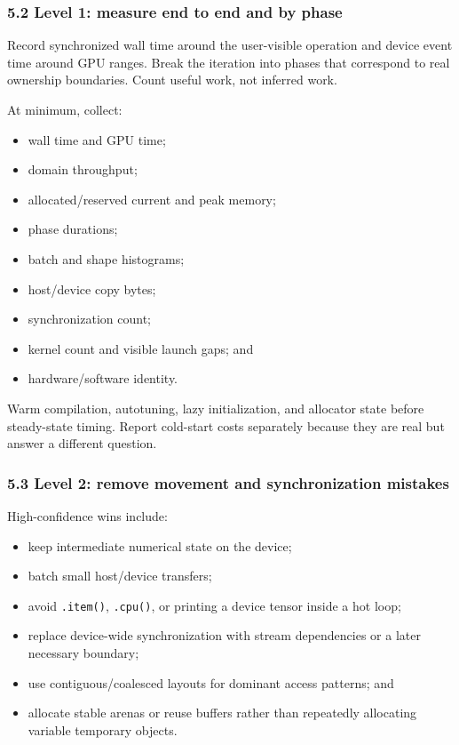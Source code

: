 \documentclass[
  10pt,
  letterpaper,
]{article}
\providecommand{\tightlist}{%
  \setlength{\itemsep}{0pt}\setlength{\parskip}{0pt}}
\begin{document}
\subsubsection{5.2 Level 1: measure end to end and by
phase}\label{52-level-1-measure-end-to-end-and-by-phase}

Record synchronized wall time around the user-visible operation and
device event time around GPU ranges. Break the iteration into phases
that correspond to real ownership boundaries. Count useful work, not
inferred work.

At minimum, collect:

\begin{itemize}
\tightlist
\item
  wall time and GPU time;
\item
  domain throughput;
\item
  allocated/reserved current and peak memory;
\item
  phase durations;
\item
  batch and shape histograms;
\item
  host/device copy bytes;
\item
  synchronization count;
\item
  kernel count and visible launch gaps; and
\item
  hardware/software identity.
\end{itemize}

Warm compilation, autotuning, lazy initialization, and allocator state
before steady-state timing. Report cold-start costs separately because
they are real but answer a different question.

\subsubsection{5.3 Level 2: remove movement and synchronization
mistakes}\label{53-level-2-remove-movement-and-synchronization-mistakes}

High-confidence wins include:

\begin{itemize}
\tightlist
\item
  keep intermediate numerical state on the device;
\item
  batch small host/device transfers;
\item
  avoid \texttt{.item()}, \texttt{.cpu()}, or printing a device tensor
  inside a hot loop;
\item
  replace device-wide synchronization with stream dependencies or a
  later necessary boundary;
\item
  use contiguous/coalesced layouts for dominant access patterns; and
\item
  allocate stable arenas or reuse buffers rather than repeatedly
  allocating variable temporary objects.
\end{itemize}
\end{document}
